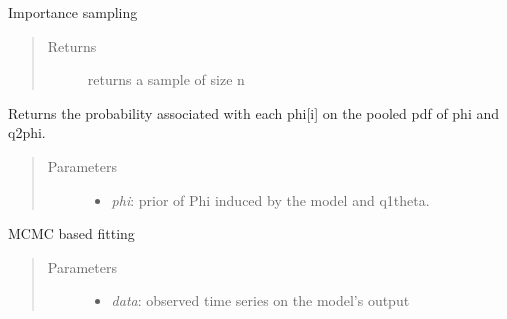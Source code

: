 \documentclass[a4paper,10pt,english]{sphinxmanual}
\begin{document}
\begin{fulllineitems}
\begin{fulllineitems}
\begin{quote}
\begin{description}
\begin{itemize}
\end{itemize}

\end{description}\end{quote}

\end{fulllineitems}


\begin{fulllineitems}
\label{BIP.Bayes:BIP.Bayes.Melding.Meld.imp_sample}
Importance sampling
\begin{quote}\begin{description}
\item[{Returns}] \leavevmode
returns a sample of size n

\end{description}\end{quote}

\end{fulllineitems}


\begin{fulllineitems}
\label{BIP.Bayes:BIP.Bayes.Melding.Meld.logPooling}
Returns the probability associated with each phi{[}i{]}
on the pooled pdf of phi and q2phi.
\begin{quote}\begin{description}
\item[{Parameters}] \leavevmode\begin{itemize}
\item {} 
\emph{phi}: prior of Phi induced by the model and q1theta.

\end{itemize}

\end{description}\end{quote}

\end{fulllineitems}


\begin{fulllineitems}
\label{BIP.Bayes:BIP.Bayes.Melding.Meld.mcmc_run}
MCMC based fitting
\begin{quote}\begin{description}
\item[{Parameters}] \leavevmode\begin{itemize}
\item {} 
\emph{data}: observed time series on the model's output


\end{itemize}
\end{description}
\end{quote}
\end{fulllineitems}
\end{fulllineitems}
\end{document}
